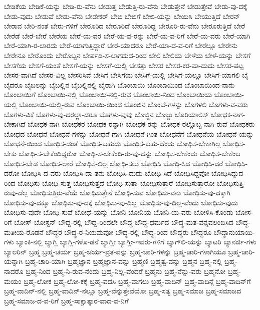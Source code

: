 {ಬೇಡಿಕೆಯ
ಬೇಡಿಕೆ-ಯನ್ನು
ಬೇಡಿ-ರು-ವೆನು
ಬೇಡುತ್ತ
ಬೇಡುತ್ತಿ-ರು-ವೆನು
ಬೇಡುತ್ತೇನೆ
ಬೇಡುತ್ತೇವೆ
ಬೇಡು-ವು-ದಕ್ಕೆ
ಬೇಡು-ವುದು
ಬೇಡುವೆ
ಬೇಡು-ವೆನು
ಬೇಡೇಕರ್‌
ಬೇಬಿ
ಬೇಬಿಗೆ
ಬೇಬಿ-ಯನ್ನು
ಬೇಯಿಸಿ
ಬೇಯುತ್ತಿದೆ
ಬೇರನ್
ಬೇರಾವ
ಬೇರಿ-ನಂತೆ
ಬೇರು-ಗಳಿಗೆ
ಬೇರೂರಿದ
ಬೇರೂರಿದೆ
ಬೇರೂರಿದ್ದ
ಬೇರೂರಿ-ರು-ವೆನು
ಬೇರೂರುತ್ತಿದೆ
ಬೇರೆ
ಬೇರೆಡೆ
ಬೇರೆ-ಬೇರೆ
ಬೇರೆಯ
ಬೇರೆ-ಯ-ವರ
ಬೇರೆ-ಯ-ವ-ರನ್ನು
ಬೇರೆ-ಯ-ವ-ರಿಗೆ
ಬೇರೆ-ಯ-ವರು
ಬೇರೆ-ಯಾಗಿ
ಬೇರೆ-ಯಾಗಿ-ರ-ಲಾರದು
ಬೇರೆ-ಯಾಗುತ್ತಿದ್ದಾರೆ
ಬೇರೆ-ಯಾದರೂ
ಬೇರೆ-ಯಾ-ದ-ವ-ರಿಗೆ
ಬೇರೆಲ್ಲೂ
ಬೇರೇನು
ಬೇರೇನೂ
ಬೇರೊಂದು
ಬೇರೊಬ್ಬನ
ಬೇರ್ಪಡಿ-ಸ-ಲಾಗದುದ-ರಿಂದ
ಬೇಲಿ
ಬೇಲಿಯ
ಬೇಳೆಯ
ಬೇಳೆ-ಯನ್ನು
ಬೇಸಗೆ
ಬೇಸಗೆಯ
ಬೇಸಗೆ-ಯಂತೆ
ಬೇಸಗೆ-ಯನ್ನು
ಬೇಸಗೆ-ಯಲ್ಲಿ
ಬೇಸತ್ತು
ಬೇಸರ
ಬೇಸರ-ಕರ-ವಾ-ದುದು
ಬೇಸರ-ಪಟ್ಟ
ಬೇಸರ-ವಾಗಿದೆ
ಬೇಸರ-ವಿಲ್ಲ
ಬೇಸರಿಸಿವೆ
ಬೇಸಿಗೆ
ಬೇಸಿಗೆಯ
ಬೇಸಿಗೆ-ಯಲ್ಲಿ
ಬೇಸಿಗೆ-ಯಲ್ಲೂ
ಬೇಸಿಗೆ-ಯಾಗಲಿ
ಬೈ
ಬೈದರೂ
ಬೈಬಲನ್ನು
ಬೈಬಲ್ಲಿನ
ಬೈಬಲ್ಲಿನಲ್ಲಿ
ಬೈರಾಗಿ
ಬೊಂಬಾಯಿ
ಬೊಂಬಾಯಿಂದ
ಬೊಂಬಾಯಿಂದ-ನಾನು
ಬೊಂಬಾಯಿಗೆ
ಬೊಂಬಾಯಿ-ನಲ್ಲಿ
ಬೊಂಬಾಯಿ-ನಲ್ಲಿ-ರುವ
ಬೊಂಬಾಯಿ-ನಿಂದ
ಬೊಂಬಾಯಿಯ
ಬೊಂಬಾಯಿ-ಯಲ್ಲಿ
ಬೊಂಬಾಯಿ-ಯಲ್ಲಿ-ರುವ
ಬೊಂಬಾಯಿ-ಯಿಂದ
ಬೊಂಬಿನ
ಬೊಂಬೆ-ಗಳನ್ನು
ಬೊಗಳಲಿ
ಬೊಗಳು-ವ-ವರು
ಬೊಗಳು-ವಿಕೆ
ಬೊಗಳು-ವು-ದರಲ್ಲಾ-ದರೂ
ಬೊಗಳು-ವುವು
ಬೊಜ್ಜಿನ
ಬೊಜ್ಜು
ಬೊರಿಯಾಲಿಸ್
ಬೋಧಕ-ನಾಗ-ಬೇಕಾಗಿದೆ
ಬೋಧಕ-ನಾಗಿ
ಬೋಧಕರ
ಬೋಧಕ-ರನ್ನಾಗಿ
ಬೋಧಕ-ರನ್ನು
ಬೋಧಕ-ರಲ್ಲೊಬ್ಬ-ನಾಗಿ-ರುವೆ
ಬೋಧಕರು
ಬೋಧದ
ಬೋಧನೆ
ಬೋಧನೆ-ಗಳನ್ನು
ಬೋಧನೆ-ಗಾಗಿ
ಬೋಧನೆ-ಗಿಂತ
ಬೋಧನೆಗೆ
ಬೋಧನೆಯ
ಬೋಧನೆ-ಯನ್ನು
ಬೋಧನೆ-ಯಿಂದ
ಬೋಧಿಸ-ದಂತೆ
ಬೋಧಿಸ-ಬಹುದು
ಬೋಧಿಸ-ಬಹು-ದೆಂದು
ಬೋಧಿಸ-ಬೇಕಾಗಿಲ್ಲ
ಬೋಧಿಸ-ಬೇಕು
ಬೋಧಿ-ಸ-ಬೇಕೆಂದಿದ್ದರೋ
ಬೋಧಿ-ಸ-ಬೇಕೆಂದಿ-ರು-ವು-ದನ್ನು
ಬೋಧಿಸ-ಬೇಕೆಂದು
ಬೋಧಿಸ-ಬೇಕೆಂಬ
ಬೋಧಿಸ-ಬೇಡ
ಬೋಧಿಸ-ಲಾರೆ
ಬೋಧಿಸ-ಲಿಲ್ಲ
ಬೋಧಿ-ಸಲು
ಬೋಧಿಸಿ
ಬೋಧಿ-ಸಿದ
ಬೋಧಿಸಿ-ದರೆ
ಬೋಧಿಸಿ-ದರೋ
ಬೋಧಿಸಿ-ದ-ವರು
ಬೋಧಿಸಿ-ದಾ-ತನು
ಬೋಧಿಸಿ-ದುದು
ಬೋಧಿ-ಸಿದೆ
ಬೋಧಿಸಿದ್ದವೋ
ಬೋಧಿಸಿದ್ದುದ-ರಿಂದ
ಬೋಧಿಸು
ಬೋಧಿ-ಸುತ್ತ
ಬೋಧಿಸುತ್ತದೆ
ಬೋಧಿ-ಸುತ್ತಾ
ಬೋಧಿಸುತ್ತಾರೆ
ಬೋಧಿಸುತ್ತಾರೋ
ಬೋಧಿಸುತ್ತಿ-ರುವು-ದೆಲ್ಲ
ಬೋಧಿಸುತ್ತಿರು-ವೆಯೆ
ಬೋಧಿಸುತ್ತೇನೆ
ಬೋಧಿ-ಸುವ
ಬೋಧಿಸು-ವನು
ಬೋಧಿಸು-ವು-ದಕ್ಕಾಗಿ
ಬೋಧಿಸು-ವು-ದಕ್ಕೂ
ಬೋಧಿಸು-ವು-ದಕ್ಕೆ
ಬೋಧಿಸು-ವು-ದಿಲ್ಲ
ಬೋಧಿಸು-ವು-ದಿಲ್ಲ-ವೆಂದು
ಬೋಧಿಸು-ವುದು
ಬೋಧಿಸು-ವುದೇ
ಬೋಧಿ-ಸುವೆ
ಬೋಧೆ-ಯನ್ನು
ಬೋನಿ
ಬೋನಿಯ
ಬೋನಿ-ಯ-ವರು
ಬೋಳಿಸಿ-ಕೊಂಡು
ಬೋಸ-ರಿಗೆ
ಬೋಸ್
ಬೋಸ್ಟನ್
ಬೌದ್ದ-ರಲ್ಲಿ
ಬೌದ್ದ-ರಿಂದಲೇ
ಬೌದ್ಧ
ಬೌದ್ಧ-ಧರ್ಮದ
ಬೌದ್ಧ-ಮತ-ವನ್ನವಲಂಬಿಸಿದ
ಬೌದ್ಧ-ಮತೀಯ-ರೊಡನೆ
ಬೌದ್ಧರ
ಬೌದ್ಧ-ರ-ನಿಯಮವೋ
ಬೌದ್ಧ-ರಲ್ಲಿ
ಬೌದ್ಧ-ರಿಂದ
ಬೌದ್ಧರು
ಬೌದ್ಧರೂ
ಬೌದ್ಧಾನುಯಾಯಿ-ಗಳು
ಬ್ಯಾಂಕಿ-ನಲ್ಲಿ
ಬ್ಯಾಗ್ಲಿ
ಬ್ಯಾಗ್ಲಿ-ಗಳೊ-ಡನೆ
ಬ್ಯಾಗ್ಲೀ
ಬ್ಯಾಗ್ಲೀ-ಇವರು-ಗಳಿಗೆ
ಬ್ಯಾಗ್‌ಲಿ-ಯನ್ನು
ಬ್ಯಾಟರಿ
ಬ್ಯಾನರ್ಜಿ-ಗಳು
ಬ್ಯಾಲರಿನ್
ಬ್ರಹ್ಮ
ಬ್ರಹ್ಮ-ಚರ್ಯ
ಬ್ರಹ್ಮ-ಚರ್ಯ-ವ್ರತ-ವನ್ನು
ಬ್ರಹ್ಮ-ಚಾರಿ-ಗಳನ್ನು
ಬ್ರಹ್ಮ-ಚಾರಿ-ಗಳಾಗಿಯೂ
ಬ್ರಹ್ಮ-ಚಾರಿ-ಯನ್ನಾಗಿ
ಬ್ರಹ್ಮ-ಚಾರಿ-ಯಾಗಿ
ಬ್ರಹ್ಮಜ್ಞಾನ
ಬ್ರಹ್ಮಜ್ಞಾನ-ವನ್ನು
ಬ್ರಹ್ಮಣಿ
ಬ್ರಹ್ಮತ್ವ-ವನ್ನು
ಬ್ರಹ್ಮನ
ಬ್ರಹ್ಮ-ನಲ್ಲಿ
ಬ್ರಹ್ಮ-ನಾದರೊ
ಬ್ರಹ್ಮ-ನಿಂದ
ಬ್ರಹ್ಮ-ನಿ-ರುವ-ನೆಂದು
ಬ್ರಹ್ಮ-ನಿಲ್ಲ-ವೆಂದರೆ
ಬ್ರಹ್ಮನು
ಬ್ರಹ್ಮ-ನೆನ್ನು-ವರು
ಬ್ರಹ್ಮನೋ
ಬ್ರಹ್ಮ-ಮಯಂ
ಬ್ರಹ್ಮ-ಲೋಕ
ಬ್ರಹ್ಮ-ಲೋ-ಕಕ್ಕೆ
ಬ್ರಹ್ಮ-ವದಸಿ
ಬ್ರಹ್ಮ-ವಾಗಲು
ಬ್ರಹ್ಮ-ವಾದಿನ್
ಬ್ರಹ್ಮ-ವಾದಿನ್ಗೆ
ಬ್ರಹ್ಮ-ವಾದಿನ್‌ಗೆ
ಬ್ರಹ್ಮ-ವಾದಿನ್‌-ನಲ್ಲಿ
ಬ್ರಹ್ಮ-ವಾದಿನ್‌-ನಲ್ಲೂ
ಬ್ರಹ್ಮ-ವೆನ್ನುತ್ತೇವೆಯೋ
ಬ್ರಹ್ಮ-ಸತ್ಯ
ಬ್ರಹ್ಮ-ಸಮಾಜ
ಬ್ರಹ್ಮ-ಸಮಾಜದ
ಬ್ರಹ್ಮ-ಸಮಾಜ-ದ-ವ-ರಿಗೆ
ಬ್ರಹ್ಮ-ಸಾಕ್ಷಾತ್ಕಾರ-ವಾದ-ವ-ನಿಗೆ
}
